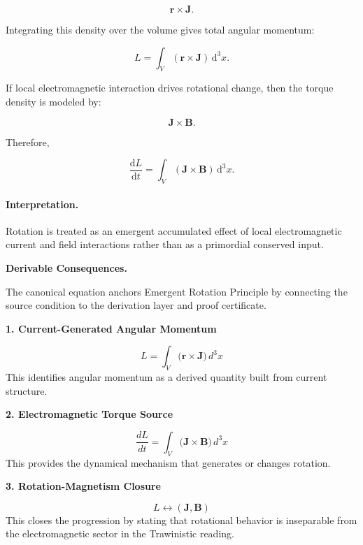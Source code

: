 \begin{equation}
\mathbf{r}\times\mathbf{J}.
\end{equation}

Integrating this density over the volume gives total angular momentum:

\begin{equation}
\boxed{
L
=
\int_V
(\mathbf{r}\times\mathbf{J})
\,\mathrm{d}^3x .
}
\end{equation}

If local electromagnetic interaction drives rotational change, then the torque density is modeled by:

\begin{equation}
\mathbf{J}\times\mathbf{B}.
\end{equation}

Therefore,

\begin{equation}
\boxed{
\frac{\mathrm{d}L}{\mathrm{d}t}
=
\int_V
(\mathbf{J}\times\mathbf{B})
\,\mathrm{d}^3x .
}
\end{equation}

\paragraph{Interpretation.}
Rotation is treated as an emergent accumulated effect of local electromagnetic current and field interactions rather than as a primordial conserved input.

\par\vspace{0.35em}
\noindent\textbf{Derivable Consequences.}\quad
\begingroup
\footnotesize
\raggedright
The canonical equation anchors Emergent Rotation Principle by connecting the source condition to the derivation layer and proof certificate.
\par\endgroup

\noindent\textbf{1. Current-Generated Angular Momentum}\par
\[
L
=
\int_{V}
\bigl(
\mathbf{r}\times\mathbf{J}
\bigr)\,d^{3}x
\]
\noindent This identifies angular momentum as a derived quantity built from current structure.\par
\noindent\textbf{2. Electromagnetic Torque Source}\par
\[
\frac{dL}{dt}
=
\int_{V}
\bigl(
\mathbf{J}\times\mathbf{B}
\bigr)\,d^{3}x
\]
\noindent This provides the dynamical mechanism that generates or changes rotation.\par
\noindent\textbf{3. Rotation-Magnetism Closure}\par
\[
L \leftrightarrow (\mathbf{J},\mathbf{B})
\]
\noindent This closes the progression by stating that rotational behavior is inseparable from the electromagnetic sector in the Trawinistic reading.\par


